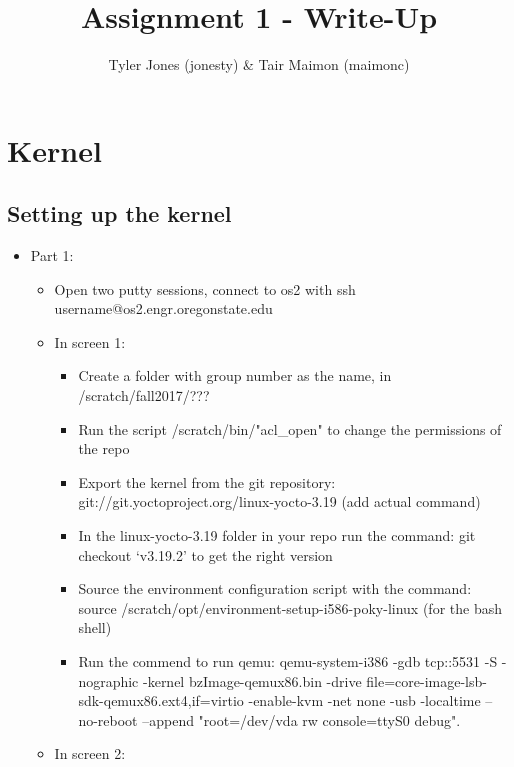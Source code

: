 \documentclass{article}
\title{Assignment 1 - Write-Up}
\begin{document}
\maketitle

\author{Tyler Jones (jonesty) \& Tair Maimon (maimonc)}
\newline


\newpage
\section{Kernel}

\subsection {Setting up the kernel}
\begin{itemize}
\item Part 1:
\begin{itemize}
\item Open two putty sessions, connect to os2 with ssh username@os2.engr.oregonstate.edu
\item In screen 1:
\begin{itemize}

\item Create a folder with group number as the name, in /scratch/fall2017/???
\item Run the script /scratch/bin/"acl\_open" to change the permissions of the repo
\item Export the kernel from the git repository: git://git.yoctoproject.org/linux-yocto-3.19 (add actual command)
\item In the linux-yocto-3.19 folder in your repo run the command: git checkout ‘v3.19.2’ to get the right version
\item Source the environment configuration script with the command: source /scratch/opt/environment-setup-i586-poky-linux (for the bash shell)
\item Run the commend to run qemu: qemu-system-i386 -gdb tcp::5531 -S -nographic -kernel bzImage-qemux86.bin -drive file=core-image-lsb-sdk-qemux86.ext4,if=virtio -enable-kvm -net none -usb -localtime --no-reboot --append "root=/dev/vda rw console=ttyS0 debug".
\end{itemize}


\item In screen 2:
\begin{itemize}


\end{itemize}
\end{itemize}
\end{itemize}
\end{document}
